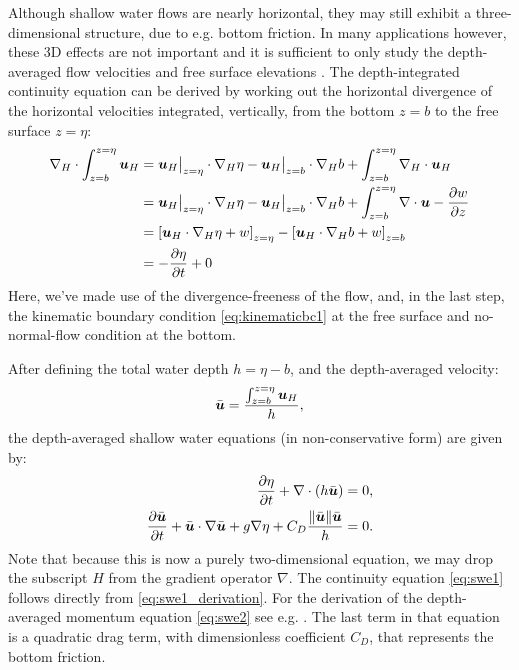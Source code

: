 Although shallow water flows are nearly horizontal, they may still exhibit a
three-dimensional structure, due to e.g. bottom friction. In many applications
however, these 3D effects are not important and it is sufficient to only study
the depth-averaged flow velocities and free surface elevations
\citep{vreugdenhil1994}. The depth-integrated continuity equation can be derived
by working out the horizontal divergence of the horizontal velocities
integrated, vertically, from the bottom $z=b$ to the free surface $z=\eta$:
\begin{equation}
\begin{split}
  \nabla_H \cdot \int_{z=b}^{z=\eta} {\mbox{\boldmath$u$}}_H &=
  {\mbox{\boldmath$u$}}_H\big|_{z=\eta}\cdot\nabla_H \eta
  -{\mbox{\boldmath$u$}}_H\big|_{z=b}\cdot\nabla_H b + \int_{z=b}^{z=\eta} \nabla_H\cdot{\mbox{\boldmath$u$}}_H \\
  &=
  {\mbox{\boldmath$u$}}_H\big|_{z=\eta}\cdot\nabla_H \eta
  -{\mbox{\boldmath$u$}}_H\big|_{z=b}\cdot\nabla_H b
  + \int_{z=b}^{z=\eta} \nabla\cdot{\mbox{\boldmath$u$}}-\frac{\partial w}{\partial z} \\
  &=
  \left[{\mbox{\boldmath$u$}}_H\cdot\nabla_H \eta + w\right]_{z=\eta}
  -\left[{\mbox{\boldmath$u$}}_H\cdot\nabla_H b + w\right]_{z=b} \\
  &=-\frac{\partial\eta}{\partial t} + 0
  \label{eq:swe1_derivation}
\end{split}
\end{equation}
Here, we've made use of the divergence-freeness of the flow, and, in the last
step, the kinematic boundary condition \eqref{eq:kinematicbc1} at the free
surface and no-normal-flow condition at the bottom.

After defining the total water depth $h=\eta-b$, and the depth-averaged
velocity:
\begin{equation}
  \bar{{\mbox{\boldmath$u$}}} = \frac{\int_{z=b}^{z=\eta} {\mbox{\boldmath$u$}}_H}{h},
\end{equation}
the depth-averaged shallow water equations (in non-conservative form) are given
by:
\begin{subequations} \label{eq:swe}
\begin{align}
  \frac{\partial\eta}{\partial t} + \nabla\cdot\left(h\bar{{\mbox{\boldmath$u$}}}\right) &=0,
  \label{eq:swe1} \\
  \frac{\partial\bar{{\mbox{\boldmath$u$}}}}{\partial t} + \bar{{\mbox{\boldmath$u$}}}\cdot\nabla\bar{{\mbox{\boldmath$u$}}}
  + g\nabla\eta + C_D \frac{\|\bar{{\mbox{\boldmath$u$}}}\|\bar{{\mbox{\boldmath$u$}}}}{h} &=0. \label{eq:swe2}
\end{align}
\end{subequations}
Note that because this is now a purely two-dimensional equation, we may drop the
subscript $H$ from the gradient operator $\nabla$. The continuity equation
\eqref{eq:swe1} follows directly from \eqref{eq:swe1_derivation}.
For the derivation of the depth-averaged momentum equation \eqref{eq:swe2} see
e.g. \citet{vreugdenhil1994}. The last term in that equation is a quadratic drag term, with
dimensionless coefficient $C_D$, that represents the bottom friction.

